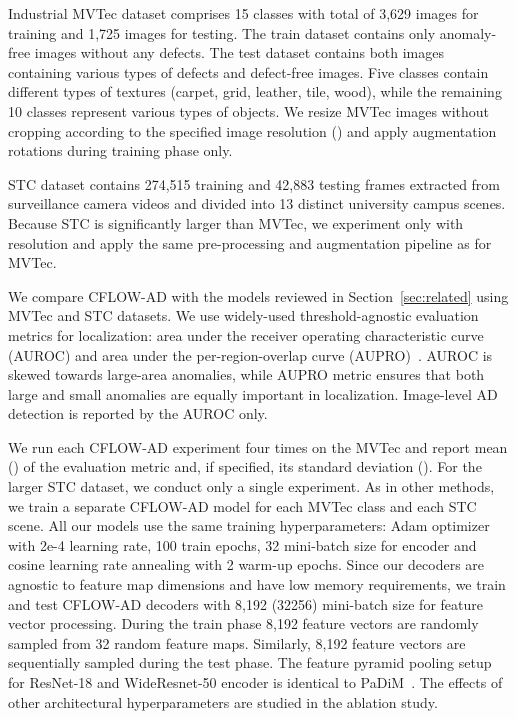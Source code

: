 \documentclass[10pt,twocolumn,letterpaper]{article}
\begin{document}
Industrial MVTec dataset comprises 15 classes with total of 3,629 images for training and 1,725 images for testing. The train dataset contains only anomaly-free images without any defects. The test dataset contains both images containing various types of defects and defect-free images. Five classes contain different types of textures (carpet, grid, leather, tile, wood), while the remaining 10 classes represent various types of objects. We resize MVTec images without cropping according to the specified image resolution (\eg  \etc) and apply  augmentation rotations during training phase only.

STC dataset contains 274,515 training and 42,883 testing frames extracted from surveillance camera videos and divided into 13 distinct university campus scenes. Because STC is significantly larger than MVTec, we experiment only with  resolution and apply the same pre-processing and augmentation pipeline as for MVTec.

We compare CFLOW-AD with the models reviewed in Section~\ref{sec:related} using MVTec and STC datasets. We use widely-used threshold-agnostic evaluation metrics for localization: area under the receiver operating characteristic curve (AUROC) and area under the per-region-overlap curve (AUPRO)~\cite{Bergmann_2019_CVPR}. AUROC is skewed towards large-area anomalies, while AUPRO metric ensures that both large and small anomalies are equally important in localization. Image-level AD detection is reported by the AUROC only.

We run each CFLOW-AD experiment four times on the MVTec and report mean () of the evaluation metric and, if specified, its standard deviation (). For the larger STC dataset, we conduct only a single experiment. As in other methods, we train a separate CFLOW-AD model for each MVTec class and each STC scene. All our models use the same training hyperparameters: Adam optimizer with 2e-4 learning rate, 100 train epochs, 32 mini-batch size for encoder and cosine learning rate annealing with 2 warm-up epochs. Since our decoders are agnostic to feature map dimensions and have low memory requirements, we train and test CFLOW-AD decoders with 8,192 (32256) mini-batch size for feature vector processing. During the train phase 8,192 feature vectors are randomly sampled from 32 random feature maps. Similarly, 8,192 feature vectors are sequentially sampled during the test phase. The feature pyramid pooling setup for ResNet-18 and WideResnet-50 encoder is identical to PaDiM~\cite{defard2020padim}. The effects of other architectural hyperparameters are studied in the ablation study.
\end{document}
